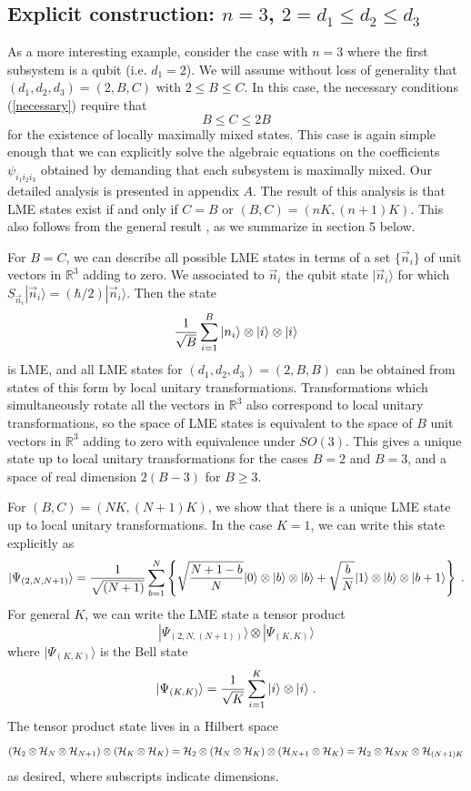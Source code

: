 \documentclass[12pt]{article}
\theoremstyle{definition}
\newcommand{\be}{\begin{equation}}
\newcommand{\ee}{\end{equation}}
\begin{document}
\subsection{Explicit construction: $n=3$, $2 = d_1 \le d_2 \le d_3$}\label{sec:Explicit23}

As a more interesting example, consider the case with $n=3$ where the first subsystem is a qubit (i.e. $d_1 = 2$). We will assume without loss of generality that $(d_1, d_2, d_3) = (2,B,C)$ with $2 \le B \le C$. In this case, the necessary conditions (\ref{necessary}) require that
\be
B \le C \le 2 B
\ee
for the existence of locally maximally mixed states. This case is again simple enough that we can explicitly solve the algebraic equations on the coefficients $\psi_{i_1 i_2 i_3}$ obtained by demanding that each subsystem is maximally mixed. Our detailed analysis is presented in appendix $A$. The result of this analysis is that LME states exist if and only if $C=B$ or $(B,C) = (nK,(n+1)K)$. This also follows from the general result \cite{mathpaper}, as we summarize in section 5 below.


For $B=C$, we can describe all possible LME states in terms of a set $\{\vec{n}_i \}$ of unit vectors in $\mathbb{R}^3$ adding to zero. We associated to $\vec{n}_i$ the qubit state $|\vec{n}_i \rangle$ for which $S_{\vec{n}_i} |\vec{n}_i \rangle = (\hbar/2)|\vec{n}_i \rangle$. Then the state
\be
{1 \over \sqrt{B}} \sum_{i=1}^B |n_{i} \rangle \otimes |i \rangle \otimes |i \rangle
\ee
is LME, and all LME states for $(d_1,d_2,d_3) = (2,B,B)$ can be obtained from states of this form by local unitary transformations. Transformations which simultaneously rotate all the vectors in $\mathbb{R}^3$ also correspond to local unitary transformations, so the space of LME states is equivalent to the space of $B$ unit vectors in $\mathbb{R}^3$ adding to zero with equivalence under $SO(3)$. This gives a unique state up to local unitary transformations for the cases $B=2$ and $B=3$, and a space of real dimension $2(B-3)$ for $B \ge 3$.

For $(B,C)=(NK,(N+1)K)$, we show that there is a unique LME state up to local unitary transformations. In the case $K=1$, we can write this state explicitly as
\be
|\Psi_{(2,N,N+1)} \rangle = {1 \over \sqrt{(N+1)}} \sum_{b=1}^N \left\{ \sqrt{N + 1 - b \over N} |0 \rangle \otimes  |b  \rangle \otimes |b \rangle + \sqrt{b \over N}  |1 \rangle \otimes|b \rangle \otimes |b+1 \rangle \right\} \; .
\ee
For general $K$, we can write the LME state a tensor product
\be
|\Psi_{(2,N,(N+1))} \rangle \otimes |\Psi_{(K,K)} \rangle
\ee
where $|\Psi_{(K,K)} \rangle$ is the Bell state
\be
|\Psi_{(K,K)} \rangle = {1 \over \sqrt{K}}  \sum_{i=1}^K  |i \rangle \otimes  |i \rangle \; .
\ee
The tensor product state lives in a Hilbert space
\be
({\cal H}_2 \otimes {\cal H}_N \otimes {\cal H}_{N+1}) \otimes ({\cal H}_K \otimes {\cal H}_K) = {\cal H}_2 \otimes ({\cal H}_N \otimes {\cal H}_K) \otimes ({\cal H}_{N+1} \otimes {\cal H}_K) = {\cal H}_2 \otimes {\cal H}_{NK} \otimes {\cal H}_{(N+1)K}
\ee
as desired, where subscripts indicate dimensions.
\end{document}
